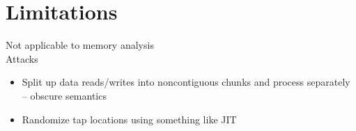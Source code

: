 \section{Limitations}

Not applicable to memory analysis \\

\noindent
Attacks

\begin{itemize}
\item Split up data reads/writes into noncontiguous chunks and process separately -- obscure semantics
\item Randomize tap locations using something like JIT
\end{itemize}
